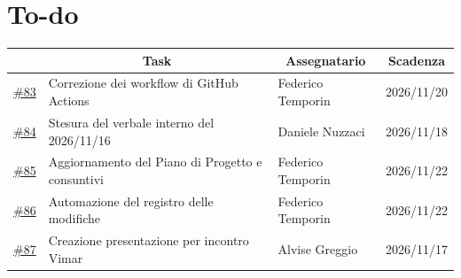 \documentclass[11pt, a4paper]{article}
\begin{document}
\section{To-do}
\begin{table}[h]
    \centering
    \renewcommand{\arraystretch}{1.5}
    \begin{tabularx}{\textwidth}{|c|X|p{3.15cm}|c|}
        \hline
        \rowcolor{gray!10} 
        \multicolumn{1}{|c|}{\textbf{ID issue}} & 
        \multicolumn{1}{c|}{\textbf{Task}} & 
        \multicolumn{1}{c|}{\textbf{Assegnatario}} & 
        \multicolumn{1}{c|}{\textbf{Scadenza}} \\
        \hline
        \href{https://github.com/On-By-One-Team/On-By-One.github.io/issues/83}{\#83} & Correzione dei workflow di GitHub Actions & Federico Temporin & 2026/11/20 \\
        \hline
        \href{https://github.com/On-By-One-Team/On-By-One.github.io/issues/84}{\#84} & Stesura del verbale interno del 2026/11/16 & Daniele Nuzzaci & 2026/11/18 \\
        \hline
        \href{https://github.com/On-By-One-Team/On-By-One.github.io/issues/85}{\#85} & Aggiornamento del Piano di Progetto e consuntivi & Federico Temporin & 2026/11/22 \\
        \hline
        \href{https://github.com/On-By-One-Team/On-By-One.github.io/issues/86}{\#86} & Automazione del registro delle modifiche & Federico Temporin & 2026/11/22 \\
        \hline
        \href{https://github.com/On-By-One-Team/On-By-One.github.io/issues/87}{\#87} & Creazione presentazione per incontro Vimar & Alvise Greggio & 2026/11/17 \\
        \hline
    \end{tabularx}
\end{table}
\end{document}
